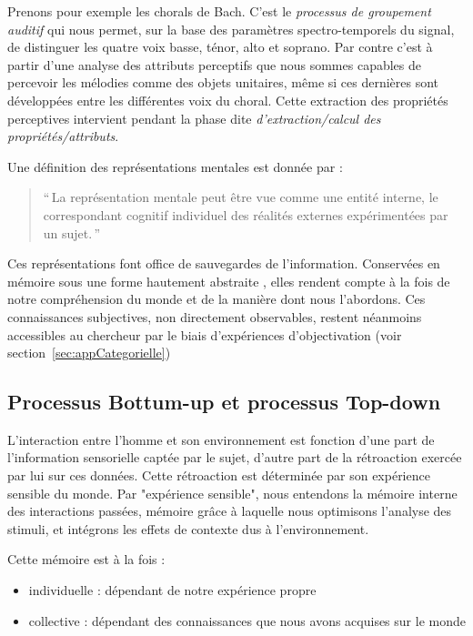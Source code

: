 Prenons pour exemple les chorals de Bach. C'est le \emph{processus de groupement auditif} qui nous permet, sur la base des paramètres spectro-temporels du signal, de distinguer les quatre voix basse, ténor, alto et soprano. Par contre c'est à partir d'une analyse des attributs perceptifs que nous sommes capables de percevoir les mélodies comme des objets unitaires, même si ces dernières sont développées entre les différentes voix du choral. Cette extraction des propriétés perceptives intervient pendant la phase dite \emph{d'extraction/calcul des propriétés/attributs}.

Une définition des représentations mentales est donnée par \citep{houde1998vocabulaire}:

\begin{quote}
``\,La représentation mentale peut être vue comme une entité interne, le correspondant cognitif individuel des réalités externes expérimentées par un sujet.\,''
\end{quote}

Ces représentations font office de sauvegardes de l'information. Conservées en mémoire sous une forme hautement abstraite \citep[p. ??]{mcadams1994penser}, elles rendent compte à la fois de notre compréhension du monde et de la manière dont nous l'abordons. Ces connaissances subjectives, non directement observables, restent néanmoins accessibles au chercheur par le biais d'expériences d'objectivation (voir section~\ref{sec:appCategorielle})

\subsection{Processus Bottum-up et processus Top-down}

L'interaction entre l'homme et son environnement est fonction d'une part de l'information sensorielle captée par le sujet, d'autre part de la rétroaction exercée par lui sur ces données. Cette rétroaction est déterminée par son expérience sensible du monde. Par "expérience sensible", nous entendons la mémoire interne des interactions passées, mémoire grâce à laquelle nous optimisons l'analyse des stimuli, et intégrons les effets de contexte dus à l'environnement.

Cette mémoire est à la fois :

\begin{itemize}
\item individuelle : dépendant de notre expérience propre
\item collective : dépendant des connaissances que nous avons acquises sur le monde
\end{itemize}


